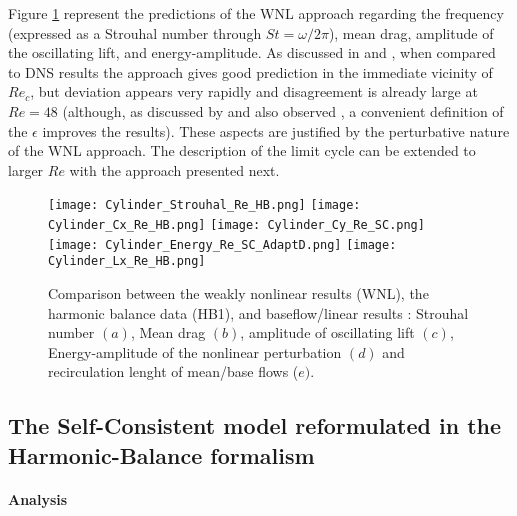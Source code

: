 \documentclass[twocolumn,10pt]{asme2ej}
\begin{document}
Figure \ref{fig:HB_SC_DATA_COMP} represent the predictions of the WNL approach regarding the frequency (expressed as a Strouhal number through $St = \omega/2\pi$), mean drag, amplitude of the oscillating lift, and energy-amplitude.
As discussed in \cite{SippLebedev} and \cite{FDR2016},  when compared to DNS results the approach gives good prediction in the immediate vicinity of $Re_c$, but deviation appears very rapidly and disagreement is already large at $Re=48$ (although, as discussed by \cite{FDR2016} and also observed  \cite{Tchoufag2015}, a convenient definition of the $\epsilon$ improves the results). 
 These aspects are justified by the perturbative nature of the WNL approach. The description of the limit cycle can be extended to larger $Re$ with the approach presented next.  

\begin{figure}
\begin{center}
\texttt{[image: Cylinder\_Strouhal\_Re\_HB.png]}
\texttt{[image: Cylinder\_Cx\_Re\_HB.png]}
\texttt{[image: Cylinder\_Cy\_Re\_SC.png]}
\texttt{[image: Cylinder\_Energy\_Re\_SC\_AdaptD.png]}
\texttt{[image: Cylinder\_Lx\_Re\_HB.png]}
\end{center}
\caption{Comparison between the weakly nonlinear results (WNL), the harmonic balance data (HB1), and baseflow/linear results : Strouhal number $(a)$, Mean drag $(b)$, amplitude of oscillating lift $(c)$, Energy-amplitude of the nonlinear perturbation $(d)$ and recirculation lenght of mean/base flows ($e)$. 
}
\label{fig:HB_SC_DATA_COMP}
\end{figure}



\subsection{The Self-Consistent model reformulated in the Harmonic-Balance formalism }
\paragraph{Analysis}

\end{document}
